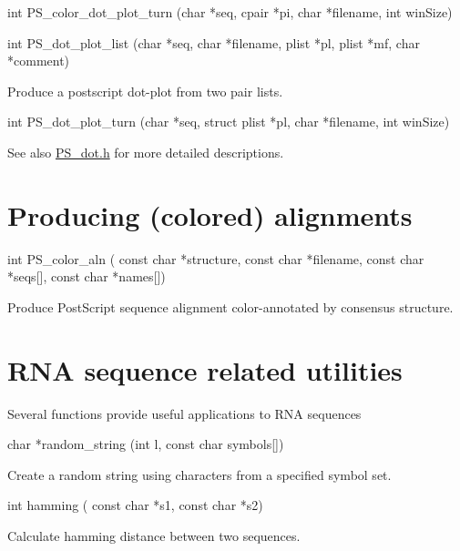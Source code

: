 \begin{DoxyVerb}int PS_color_dot_plot_turn (char *seq,
                            cpair *pi,
                            char *filename,
                            int winSize)
\end{DoxyVerb}


\begin{DoxyVerb}int PS_dot_plot_list (char *seq,
                      char *filename,
                      plist *pl,
                      plist *mf,
                      char *comment)
\end{DoxyVerb}
 Produce a postscript dot-\/plot from two pair lists.

\begin{DoxyVerb}int PS_dot_plot_turn (char *seq,
                      struct plist *pl,
                      char *filename,
                      int winSize)
\end{DoxyVerb}


\begin{DoxySeeAlso}{See also}
\hyperlink{PS__dot_8h}{P\+S\+\_\+dot.\+h} for more detailed descriptions.
\end{DoxySeeAlso}
\hypertarget{mp_utils_utils_aln}{}\section{Producing (colored) alignments}\label{mp_utils_utils_aln}
\begin{DoxyVerb}int PS_color_aln (
            const char *structure,
            const char *filename,
            const char *seqs[],
            const char *names[])
\end{DoxyVerb}
 Produce Post\+Script sequence alignment color-\/annotated by consensus structure.

\hypertarget{mp_utils_utils_seq}{}\section{R\+N\+A sequence related utilities}\label{mp_utils_utils_seq}
Several functions provide useful applications to R\+N\+A sequences

\begin{DoxyVerb}char  *random_string (int l,
                      const char symbols[])
\end{DoxyVerb}
 Create a random string using characters from a specified symbol set.

\begin{DoxyVerb}int   hamming ( const char *s1,
                const char *s2)
\end{DoxyVerb}
 Calculate hamming distance between two sequences.

